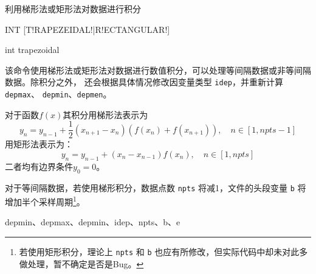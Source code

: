 \label{cmd:int}

利用梯形法或矩形法对数据进行积分

\begin{SACSTX}
INT [T!RAPEZEIDAL!|R!ECTANGULAR!]
\end{SACSTX}

\begin{SACDFT}
int trapezoidal
\end{SACDFT}

该命令使用梯形法或矩形法对数据进行数值积分，可以处理等间隔数据或非等间隔数据。除积分之外，
还会根据具体情况修改因变量类型 \texttt{idep}，并重新计算 \texttt{depmax}、
\texttt{depmin}、\texttt{depmen}。

对于函数$f(x)$其积分用梯形法表示为
\[
    y_n = y_{n-1} + \frac{1}{2}(x_{n+1}-x_n) (f(x_n)+f(x_{n+1})), \quad n\in[1,npts-1]
\]
用矩形法表示为：
\[
    y_n = y_{n-1} + (x_n-x_{n-1})f(x_n), \quad n\in[1,npts]
\]
二者均有边界条件$y_0=0$。

对于等间隔数据，若使用梯形积分，数据点数 \texttt{npts} 将减1，文件的头段变量 
\texttt{b} 将增加半个采样周期\footnote{若使用矩形积分，理论上 \texttt{npts} 和
\texttt{b} 也应有所修改，但实际代码中却未对此多做处理，暂不确定是否是Bug。}。

depmin、depmax、depmin、idep、npts、b、e
